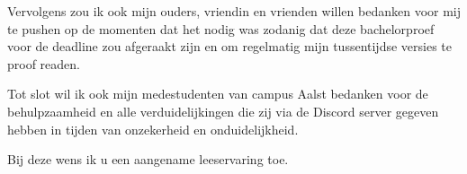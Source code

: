 Vervolgens zou ik ook mijn ouders, vriendin en vrienden willen bedanken voor mij te pushen op de momenten dat het nodig was zodanig dat deze bachelorproef voor de deadline zou afgeraakt zijn en om regelmatig mijn tussentijdse versies te proof readen.

Tot slot wil ik ook mijn medestudenten van campus Aalst bedanken voor de behulpzaamheid en alle verduidelijkingen die zij via de Discord server gegeven hebben in tijden van onzekerheid en onduidelijkheid.

Bij deze wens ik u een aangename leeservaring toe.

